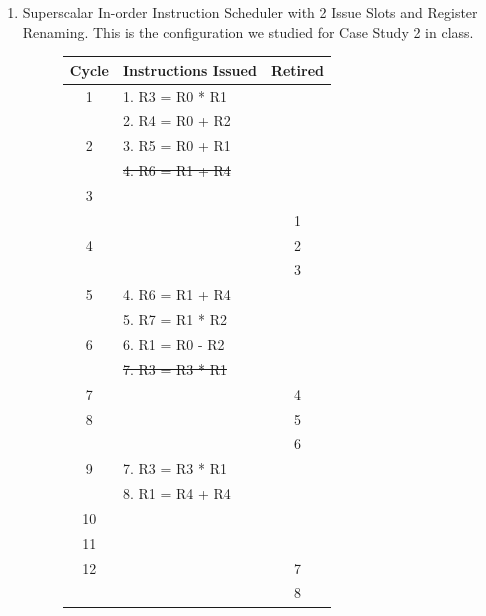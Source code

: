 \documentclass{article}
\begin{document}
\begin{enumerate}
    \item Superscalar In-order Instruction Scheduler with 2 Issue Slots and Register Renaming. This is the configuration we studied for Case Study 2 in class. 
    \begin{figure}[H]
        \centering
        \begin{minipage}[t]{0.45\textwidth}
            \centering
            \renewcommand{\arraystretch}{0.9} %
            \setlength{\tabcolsep}{3pt} %
            \begin{tabular}{|c|p{3.4cm}|c|}
                \hline
                \textbf{Cycle} & \textbf{Instructions Issued} & \textbf{Retired} \\ \hline
                1 & 1. R3 = R0 * R1 & \\ 
                  & 2. R4 = R0 + R2 & \\ \hline
                2 & 3. R5 = R0 + R1 & \\ 
                  & \sout{4. R6 = R1 + R4} & \\ \hline
                3 &                 & \\ \hline
                  &                 & 1 \\ 
                4 &                 & 2 \\ 
                  &                 & 3 \\ \hline
                5 & 4. R6 = R1 + R4 & \\
                  & 5. R7 = R1 * R2 & \\ \hline 
                6 & 6. R1 = R0 - R2 & \\ 
                  & \sout{7. R3 = R3 * R1} & \\ \hline 
                7 &                 & 4 \\ \hline 
                8 &                 & 5 \\ \hline 
                  &                 & 6 \\ \hline 
                9 & 7. R3 = R3 * R1 & \\ 
                  & 8. R1 = R4 + R4 & \\ \hline 
               10 &                 & \\ \hline 
               11 &                 & \\ \hline 
               12 &                 & 7 \\ 
                  &                 & 8 \\ \hline 
            \end{tabular}

\end{minipage}
\end{figure}
\end{enumerate}
\end{document}
